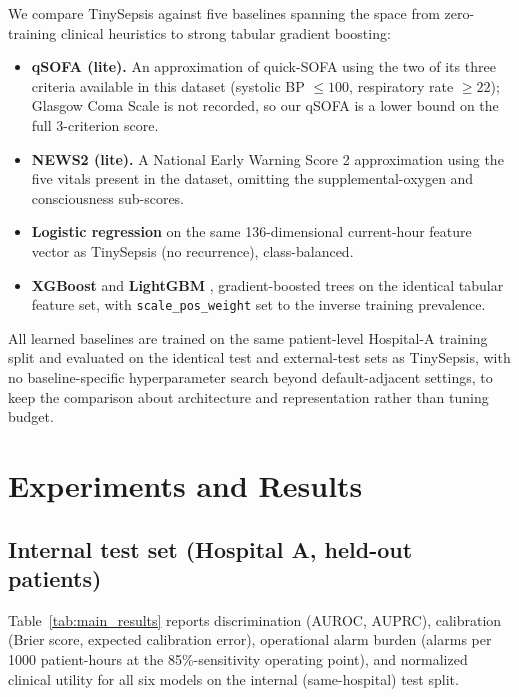 \documentclass[11pt]{article}
\begin{document}
We compare TinySepsis against five baselines spanning the space from zero-training clinical heuristics to strong tabular gradient boosting:
\begin{itemize}[leftmargin=*]
    \item \textbf{qSOFA (lite).} An approximation of quick-SOFA using the two of its three criteria available in this dataset (systolic BP $\le100$, respiratory rate $\ge22$); Glasgow Coma Scale is not recorded, so our qSOFA is a lower bound on the full 3-criterion score.
    \item \textbf{NEWS2 (lite).} A National Early Warning Score 2 approximation \citep{royalcollege2017news2} using the five vitals present in the dataset, omitting the supplemental-oxygen and consciousness sub-scores.
    \item \textbf{Logistic regression} on the same 136-dimensional current-hour feature vector as TinySepsis (no recurrence), class-balanced.
    \item \textbf{XGBoost} \citep{chen2016xgboost} and \textbf{LightGBM} \citep{ke2017lightgbm}, gradient-boosted trees on the identical tabular feature set, with \texttt{scale\_pos\_weight} set to the inverse training prevalence.
\end{itemize}
All learned baselines are trained on the same patient-level Hospital-A training split and evaluated on the identical test and external-test sets as TinySepsis, with no baseline-specific hyperparameter search beyond default-adjacent settings, to keep the comparison about architecture and representation rather than tuning budget.

\section{Experiments and Results}
\label{sec:results}

\subsection{Internal test set (Hospital A, held-out patients)}
Table~\ref{tab:main_results} reports discrimination (AUROC, AUPRC), calibration (Brier score, expected calibration error), operational alarm burden (alarms per 1000 patient-hours at the 85\%-sensitivity operating point), and normalized clinical utility for all six models on the internal (same-hospital) test split.

\begin{table}[t]
\centering
\caption{Internal test set (Hospital A, held-out patients), primary 6h-horizon task.}
\label{tab:main_results}

\end{table}
\end{document}
